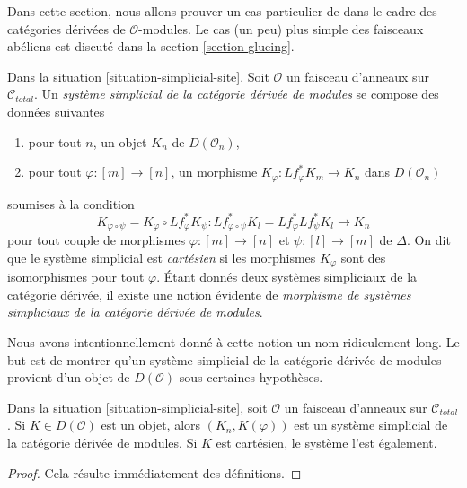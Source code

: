 \noindent
Dans cette section, nous allons prouver un cas particulier de
\cite[Proposition 3.2.9]{BBD} dans le cadre des catégories
dérivées de $\mathcal{O}$-modules. Le cas (un peu) plus simple des faisceaux abéliens
est discuté dans la section \ref{section-glueing}.

\begin{definition}
\label{definition-cartesian-derived-modules}
Dans la situation \ref{situation-simplicial-site}. Soit $\mathcal{O}$
un faisceau d'anneaux sur $\mathcal{C}_{total}$. Un
{\it système simplicial de la catégorie dérivée de modules}
se compose des données suivantes
\begin{enumerate}
\item pour tout $n$, un objet $K_n$ de $D(\mathcal{O}_n)$,
\item pour tout $\varphi : [m] \to [n]$, un morphisme
$K_\varphi : Lf_\varphi^*K_m \to K_n$ dans $D(\mathcal{O}_n)$
\end{enumerate}
soumises à la condition
$$
K_{\varphi \circ \psi} = K_\varphi \circ Lf_\varphi^*K_\psi :
Lf_{\varphi \circ \psi}^*K_l = Lf_\varphi^* Lf_\psi^*K_l
\longrightarrow
K_n
$$
pour tout couple de morphismes $\varphi : [m] \to [n]$ et $\psi : [l] \to [m]$ de $\Delta$.
On dit que le système simplicial est {\it cartésien} si les morphismes $K_\varphi$
sont des isomorphismes pour tout $\varphi$.
Étant donnés deux systèmes simpliciaux de la catégorie dérivée,
il existe une notion évidente de
{\it morphisme de systèmes simpliciaux de la catégorie dérivée de modules}.
\end{definition}

\noindent
Nous avons intentionnellement donné à cette notion un nom ridiculement long.
Le but est de montrer qu'un système simplicial de la catégorie dérivée
de modules provient d'un objet de $D(\mathcal{O})$ sous certaines
hypothèses.

\begin{lemma}
\label{lemma-cartesian-objects-derived-modules}
Dans la situation \ref{situation-simplicial-site}, soit $\mathcal{O}$ un faisceau d'anneaux
sur $\mathcal{C}_{total}$.
Si $K \in D(\mathcal{O})$ est un objet, alors $(K_n, K(\varphi))$
est un système simplicial de la catégorie dérivée de modules.
Si $K$ est cartésien, le système l’est également.
\end{lemma}

\begin{proof}
Cela résulte immédiatement des définitions.
\end{proof}

